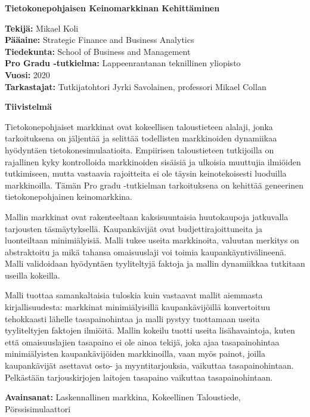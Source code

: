 

\thispagestyle{plain}
\begin{center}
    \Large
    \textbf{Tietokonepohjaisen Keinomarkkinan Kehitt\"aminen}
        
    \vspace{0.4cm}
        
    \vspace{0.4cm}
    \begin{flushleft}
        \normalsize
        \textbf{Tekijä:} Mikael Koli \\
        \textbf{Pääaine:} Strategic Finance and Business Analytics \\
        \textbf{Tiedekunta:} School of Business and Management \\
        \textbf{Pro Gradu -tutkielma:} Lappeenrantanan teknillinen yliopisto  \\
        \textbf{Vuosi:} 2020 \\
        \textbf{Tarkastajat:} Tutkijatohtori Jyrki Savolainen, professori Mikael Collan
    \end{flushleft}
       
    \vspace{0.5cm}
    \textbf{Tiivistelmä}
\end{center}

Tietokonepohjaiset markkinat ovat kokeellisen taloustieteen alalaji, jonka tarkoituksena
on jäljentää ja selittää todellisten markkinoiden dynamiikaa hyödyntäen
tietokonesimulaatioita. Empiirisen taloustieteen tutkijoilla on rajallinen kyky kontrolloida
markkinoiden sisäisiä ja ulkoisia muuttujia ilmiöiden tutkimiseen, mutta vastaavia rajoitteita
ei ole täysin keinotekoisesti luoduilla markkinoilla. Tämän Pro gradu -tutkielman tarkoituksena on 
kehittää geneerinen tietokonepohjainen keinomarkkina. 

Mallin markkinat ovat rakenteeltaan kaksisuuntaisia huutokaupoja jatkuvalla tarjousten täsmäytyksellä.
Kaupankävijät ovat budjettirajoittuneita ja luonteiltaan minimiälyisiä. Malli tukee useita markkinoita, 
valuutan merkitys on abstraktoitu ja mikä tahansa omaisuuslaji voi toimia kaupankäyntivälineenä. 
Malli validoidaan hyödyntäen tyyliteltyjä faktoja ja mallin dynamiikkaa
tutkitaan useilla kokeilla.

Malli tuottaa samankaltaisia tuloskia kuin vastaavat mallit aiemmasta kirjallisuudesta: markkinat minimiälyisillä
kaupankävijöillä konvertoituu tehokkaasti lähelle tasapainohintaa ja malli pystyy tuottamaan useita tyyliteltyjen 
faktojen ilmiöitä. Mallin kokeilu tuotti useita lisähavaintoja, kuten että omaisuuslajien tasapaino ei ole ainoa tekijä,
joka ajaa tasapainohintaa minimiälyisten kaupankävijöiden markkinoilla, vaan myös painot, joilla kaupankävijät 
asettavat osto- ja myyntitarjouksia, vaikuttaa tasapainohintaan. Pelkästään tarjouskirjojen laitojen tasapaino vaikuttaa 
tasapainohintaan.

\textbf{Avainsanat:} Laskennallinen markkina, Kokeellinen Taloustiede, Pörssisimulaattori